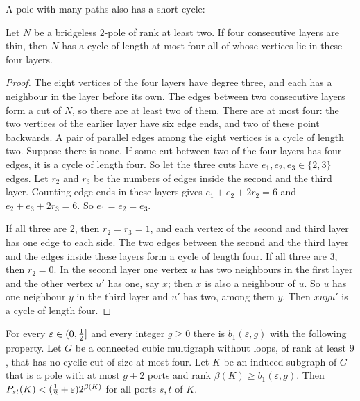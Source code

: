 A pole with many paths also has a short cycle:

\begin{lemma}\label{lem:fourlayers}
Let $N$ be a bridgeless $2$-pole of rank at least two. If four consecutive layers are thin, then
$N$ has a cycle of length at most four all of whose vertices lie in these four layers.
\end{lemma}

\begin{proof}
The eight vertices of the four layers have degree three, and each has a neighbour in the layer
before its own. The edges between two consecutive layers form a cut of $N$, so there are at least
two of them. There are at most four: the two vertices of the earlier layer have six edge ends, and
two of these point backwards. A pair of parallel edges among the eight vertices is a cycle of
length two. Suppose there is none. If some cut between two of the four layers has four edges, it
is a cycle of length four. So let the three cuts have $e_1,e_2,e_3\in\{2,3\}$ edges. Let $r_2$ and
$r_3$ be the numbers of edges inside the second and the third layer. Counting edge ends in these
layers gives $e_1+e_2+2r_2=6$ and $e_2+e_3+2r_3=6$. So $e_1=e_2=e_3$.

If all three are $2$, then $r_2=r_3=1$, and each vertex of the second and third layer has one edge
to each side. The two edges between the second and the third layer and the edges inside these
layers form a cycle of length four. If all three are $3$, then $r_2=0$. In the second layer one
vertex $u$ has two neighbours in the first layer and the other vertex $u'$ has one, say $x$; then
$x$ is also a neighbour of $u$. So $u$ has one neighbour $y$ in the third layer and $u'$ has two,
among them $y$. Then $xuyu'$ is a cycle of length four.
\end{proof}

\begin{corollary}\label{cor:nodense}
For every $\varepsilon\in(0,\tfrac12]$ and every integer $g\ge0$ there is $b_1(\varepsilon,g)$ with the
following property. Let $G$ be a connected cubic multigraph without loops, of rank at least $9$,
that has no cyclic cut of size at most four. Let $K$ be an induced subgraph of $G$ that is a pole
with at most $g+2$ ports and rank $\beta(K)\ge b_1(\varepsilon,g)$. Then
$P_{st}(K)<(\tfrac12+\varepsilon)2^{\beta(K)}$ for all ports $s,t$ of $K$.
\end{corollary}


